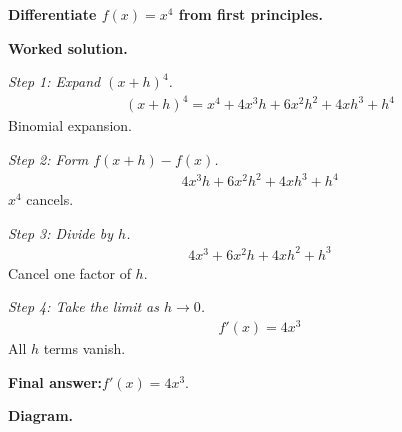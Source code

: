 \documentclass[11pt]{article}
\newcommand{\question}[1]{\par\medskip\noindent\textbf{#1}\par}
\begin{document}
\question{Differentiate \( f(x) = x^4 \) from first principles.}

\textbf{Worked solution.}

\textit{Step 1: Expand \( (x+h)^4 \).}
\[\begin{gathered}
(x+h)^4 = x^4 + 4x^3 h + 6x^2 h^2 + 4x h^3 + h^4
\end{gathered}\]
Binomial expansion.

\textit{Step 2: Form \( f(x+h) - f(x) \).}
\[\begin{gathered}
4x^3 h + 6x^2 h^2 + 4x h^3 + h^4
\end{gathered}\]
\( x^4 \) cancels.

\textit{Step 3: Divide by \( h \).}
\[\begin{gathered}
4x^3 + 6x^2 h + 4x h^2 + h^3
\end{gathered}\]
Cancel one factor of \( h \).

\textit{Step 4: Take the limit as \( h \to 0 \).}
\[\begin{gathered}
f'(x) = 4x^3
\end{gathered}\]
All \( h \) terms vanish.

\begin{answerbox}
\textbf{Final answer:}\quad \(\displaystyle  f'(x) = 4x^3 \).
\end{answerbox}
\textbf{Diagram.}
\end{document}
